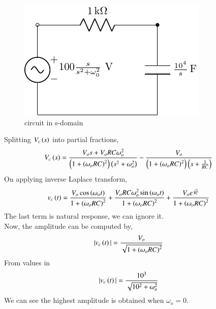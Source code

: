 \documentclass[journal,12pt,twocolumn]{IEEEtran}
\theoremstyle{remark}
\begin{document}
\begin{figure}[h!]
    \includegraphics[width = \columnwidth]{figs/c_fig2.pdf}
    \caption{circuit in s-domain }
    \centering
    \label{fig: bm_16_fig_2}
\end{figure}
Splitting $ V_c\left(s\right)$ into partial fractions,
\begin{align}
V_c\left(s\right) &= \frac{V_os + V_oRC\omega_o^2}{\left(1+\left(\omega_oRC\right)^2\right)\left(s^2+\omega_o^2\right)}-\frac{V_o}{\left(1+\left(\omega_oRC\right)^2\right)\left(s+\frac{1}{RC}\right)}
\end{align}
On applying inverse Laplace transform,
\begin{align}
v_c\left(t\right)&= \frac{V_o\cos{\ensuremath{\left(\omega_o t\right)}}}{1+\left(\omega_oRC\right)^2}+\frac{V_oRC\omega_o^2\sin{\ensuremath{\left(\omega_o t\right)}}}{1+\left(\omega_oRC\right)^2}+\frac{V_oe^{\frac{-t}{RC}}}{1+\left(\omega_oRC\right)^2}
\end{align}
\vspace{3cm}
The last term is natural response, we can ignore it.\\
Now, the amplitude can be computed by,
\begin{align}
|v_c\left(t\right)| &= \frac{V_o}{\sqrt{1+\left(\omega_oRC\right)^2}}
\end{align}
From values in 
\begin{align}
|v_c\left(t\right)| &= \frac{10^3}{\sqrt{10^2+\omega_o^2}}
\end{align}
We can see the highest amplitude is obtained when $ \omega_o = 0$.
\end{document}
